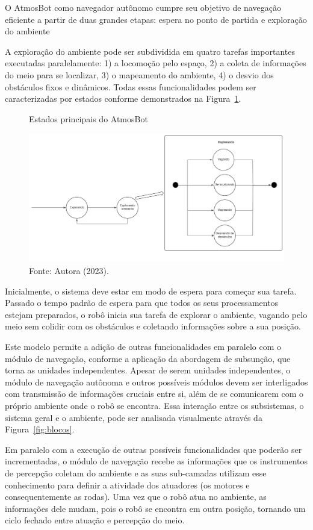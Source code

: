 O AtmosBot como navegador autônomo cumpre seu objetivo de navegação eficiente a partir de duas grandes etapas: espera no ponto de partida e exploração do ambiente

A exploração do ambiente pode ser subdividida em quatro tarefas importantes executadas paralelamente: 1) a locomoção pelo espaço, 2) a coleta de informações do meio para se localizar, 3) o mapeamento do ambiente, 4) o desvio dos obstáculos fixos e dinâmicos. Todas essas funcionalidades podem ser caracterizadas por estados conforme demonstrados na Figura~\ref{fig:estados}. 

\begin{figure}[h]
    \centering
    \caption{Estados principais do AtmosBot}
    \includegraphics[scale=0.45]{estados.png}
    \caption*{Fonte: Autora (2023).}
    \label{fig:estados}
\end{figure}


Inicialmente, o sistema deve estar em modo de espera para começar sua tarefa. Passado o tempo padrão de espera para que todos os seus processamentos estejam preparados, o robô inicia sua tarefa de explorar o ambiente, vagando pelo meio sem colidir com os obstáculos e coletando informações sobre a sua posição. 

Este modelo permite a adição de outras funcionalidades em paralelo com o módulo de navegação, conforme a aplicação da abordagem de subsunção, que torna as unidades independentes. Apesar de serem unidades independentes, o módulo de navegação autônoma e outros possíveis módulos devem ser interligados com transmissão de informações cruciais entre si, além de se comunicarem com o próprio ambiente onde o robô se encontra. Essa interação entre os subsistemas, o sistema geral e o ambiente, pode ser analisada visualmente através da Figura~\ref{fig:blocos}.  

Em paralelo com a execução de outras possíveis funcionalidades que poderão ser incrementadas, o módulo de navegação recebe as informações que os instrumentos de percepção coletam do ambiente e as suas sub-camadas utilizam esse conhecimento para definir a atividade dos atuadores (os motores e consequentemente as rodas). Uma vez que o robô atua no ambiente, as informações dele mudam, pois o robô se encontra em outra posição, tornando um ciclo fechado entre atuação e percepção do meio.

